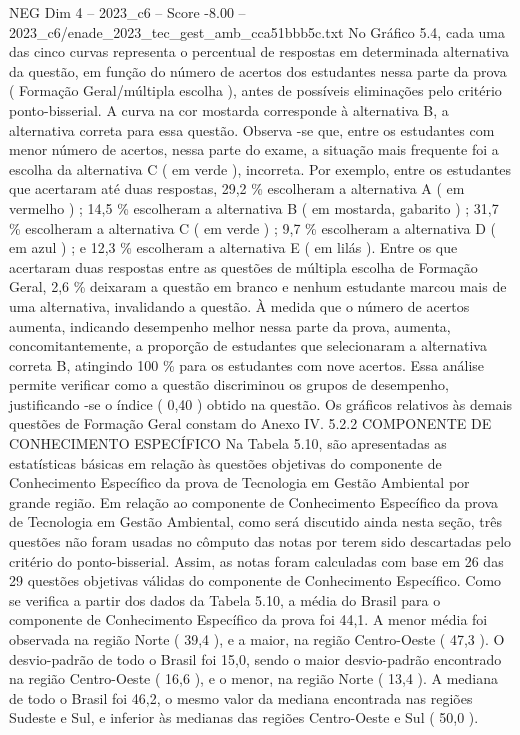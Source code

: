 \begin{textsample}{NEG Dim 4 – 2023\_c6 – Score -8.00 – 2023\_c6/enade\_2023\_tec\_gest\_amb\_cca51bbb5c.txt}
No Gráfico 5.4, cada uma das cinco curvas representa o percentual de respostas em determinada alternativa da questão, em função do número de acertos dos estudantes nessa parte da prova ( Formação Geral/múltipla escolha ), antes de possíveis eliminações pelo critério ponto-bisserial.
A curva na cor mostarda corresponde à alternativa B, a alternativa correta para essa questão.
Observa -se que, entre os estudantes com menor número de acertos, nessa parte do exame, a situação mais frequente foi a escolha da alternativa C ( em verde ), incorreta.
Por exemplo, entre os estudantes que acertaram até duas respostas, 29,2 \% escolheram a alternativa A ( em vermelho ) ; 14,5 \% escolheram a alternativa B ( em mostarda, gabarito ) ; 31,7 \% escolheram a alternativa C ( em verde ) ; 9,7 \% escolheram a alternativa D ( em azul ) ; e 12,3 \% escolheram a alternativa E ( em lilás ).
Entre os que acertaram duas respostas entre as questões de múltipla escolha de Formação Geral, 2,6 \% deixaram a questão em branco e nenhum estudante marcou mais de uma alternativa, invalidando a questão.
À medida que o número de acertos aumenta, indicando desempenho melhor nessa parte da prova, aumenta, concomitantemente, a proporção de estudantes que selecionaram a alternativa correta B, atingindo 100 \% para os estudantes com nove acertos.
Essa análise permite verificar como a questão discriminou os grupos de desempenho, justificando -se o índice ( 0,40 ) obtido na questão.
Os gráficos relativos às demais questões de Formação Geral constam do Anexo IV. 5.2.2 COMPONENTE DE CONHECIMENTO ESPECÍFICO Na Tabela 5.10, são apresentadas as estatísticas básicas em relação às questões objetivas do componente de Conhecimento Específico da prova de Tecnologia em Gestão Ambiental por grande região.
Em relação ao componente de Conhecimento Específico da prova de Tecnologia em Gestão Ambiental, como será discutido ainda nesta seção, três questões não foram usadas no cômputo das notas por terem sido descartadas pelo critério do ponto-bisserial.
Assim, as notas foram calculadas com base em 26 das 29 questões objetivas válidas do componente de Conhecimento Específico.
Como se verifica a partir dos dados da Tabela 5.10, a média do Brasil para o componente de Conhecimento Específico da prova foi 44,1.
A menor média foi observada na região Norte ( 39,4 ), e a maior, na região Centro-Oeste ( 47,3 ).
O desvio-padrão de todo o Brasil foi 15,0, sendo o maior desvio-padrão encontrado na região Centro-Oeste ( 16,6 ), e o menor, na região Norte ( 13,4 ).
A mediana de todo o Brasil foi 46,2, o mesmo valor da mediana encontrada nas regiões Sudeste e Sul, e inferior às medianas das regiões Centro-Oeste e Sul ( 50,0 ).

\end{textsample}
